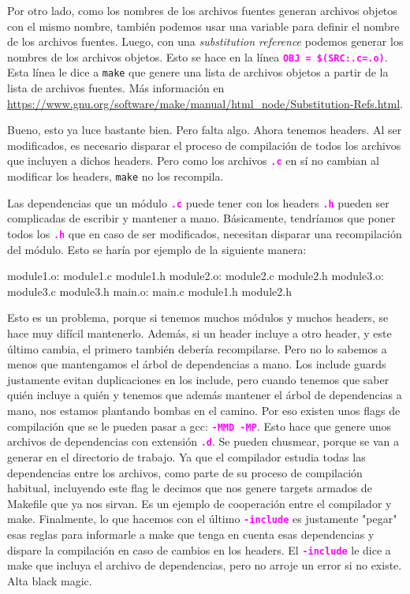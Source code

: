 \documentclass[]{scrartcl}
\newcommand{\hl}[1]{\textcolor{magenta}{\textbf{\texttt{#1}}}}
\begin{document}
Por otro lado, como los nombres de los archivos fuentes generan archivos objetos con el mismo nombre, también podemos usar una variable para definir el nombre de los archivos fuentes. Luego, con una \textit{substitution reference} podemos generar los nombres de los archivos objetos. Esto se hace en la línea \hl{OBJ = \$(SRC:.c=.o)}. Esta línea le dice a \texttt{make} que genere una lista de archivos objetos a partir de la lista de archivos fuentes. Más información en \url{https://www.gnu.org/software/make/manual/html_node/Substitution-Refs.html}.


Bueno, esto ya luce bastante bien. Pero falta algo. Ahora tenemos headers. Al ser modificados, es necesario disparar el proceso de compilación de todos los archivos que incluyen a dichos headers. Pero como los archivos \hl{.c} en sí no cambian al modificar los headers, \texttt{make} no los recompila. 

Las dependencias que un módulo \hl{.c} puede tener con los headers \hl{.h} pueden ser complicadas de escribir y mantener a mano. Básicamente, tendríamos que poner todos los \hl{.h} que en caso de ser modificados, necesitan disparar una recompilación del módulo. Esto se haría por ejemplo de la siguiente manera:
\begin{bashbox}[minted language=make]
  module1.o: module1.c module1.h
  module2.o: module2.c module2.h
  module3.o: module3.c module3.h
  main.o: main.c module1.h module2.h
\end{bashbox}

Esto es un problema, porque si tenemos muchos módulos y muchos headers, se hace muy difícil mantenerlo. Además, si un header incluye a otro header, y este último cambia, el primero también debería recompilarse. Pero no lo sabemos a menos que mantengamos el árbol de dependencias a mano. Los include guards justamente evitan duplicaciones en los include, pero cuando tenemos que saber quién incluye a quién y tenemos que además mantener el árbol de dependencias a mano, nos estamos plantando bombas en el camino. Por eso existen unos flags de compilación que se le pueden pasar a gcc: \hl{-MMD -MP}. Esto hace que genere unos archivos de dependencias con extensión \hl{.d}. Se pueden chusmear, porque se van a  generar en el directorio de trabajo. 
Ya que el compilador estudia todas las dependencias entre los archivos, como parte de su proceso de compilación habitual, incluyendo este flag le decimos que nos genere targets armados de Makefile que ya nos sirvan. Es un ejemplo de cooperación entre el compilador y make. Finalmente, lo que hacemos con el último \hl{-include} es justamente "pegar" esas reglas para informarle a make que tenga en cuenta esas dependencias y dispare la compilación en caso de cambios en los headers. El \hl{-include} le dice a make que incluya el archivo de dependencias, pero no arroje un error si no existe. Alta black magic.
\end{document}
